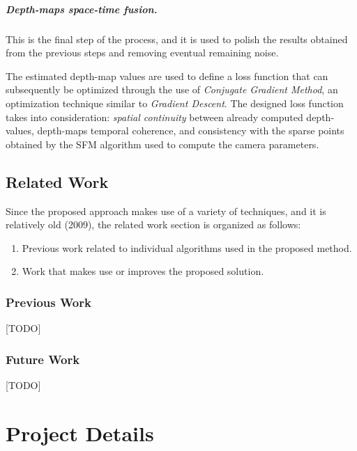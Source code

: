 \documentclass[notitlepage,english]{hgbreport}
\begin{document}
\paragraph{Depth-maps space-time fusion.} This is the final step of the process, and it is used to polish the results obtained from the previous steps and removing eventual remaining noise.

The estimated depth-map values are used to define a loss function  that can subsequently be optimized through the use of \emph{Conjugate Gradient Method}, an optimization technique similar to \emph{ Gradient Descent}.
The designed loss function takes into consideration: \emph{spatial continuity} between already computed depth-values, depth-maps temporal coherence, and consistency with the sparse points obtained by the SFM algorithm used to compute the camera parameters.

 

\section{Related Work}
Since the proposed approach makes use of a variety of techniques, and it is relatively old (2009), the related work section is organized as follows:
\begin{enumerate}
	\item Previous work related to individual algorithms used in the proposed method.
	\item Work that makes use or improves the proposed solution. 
\end{enumerate}
\subsection{Previous Work}
[TODO]
\subsection{Future Work}
[TODO]





\chapter{Project Details}
\end{document}
